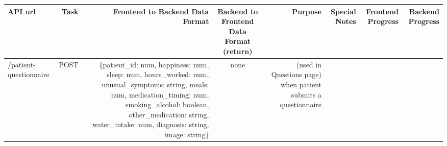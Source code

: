 \documentclass[]{book}
\begin{document}
\begin{longtable}[]{@{}lrrcrrrr@{}}
\toprule
\begin{minipage}[b]{0.13\columnwidth}\raggedright
API url\strut
\end{minipage} & \begin{minipage}[b]{0.14\columnwidth}\raggedleft
Task\strut
\end{minipage} & \begin{minipage}[b]{0.14\columnwidth}\raggedleft
Frontend to Backend Data Format\strut
\end{minipage} & \begin{minipage}[b]{0.15\columnwidth}\centering
Backend to Frontend Data Format (return)\strut
\end{minipage} & \begin{minipage}[b]{0.06\columnwidth}\raggedleft
Purpose\strut
\end{minipage} & \begin{minipage}[b]{0.06\columnwidth}\raggedleft
Special Notes\strut
\end{minipage} & \begin{minipage}[b]{0.06\columnwidth}\raggedleft
Frontend Progress\strut
\end{minipage} & \begin{minipage}[b]{0.06\columnwidth}\raggedleft
Backend Progress\strut
\end{minipage}\tabularnewline
\midrule
\endhead
\begin{minipage}[t]{0.13\columnwidth}\raggedright
/patient-questionnaire\strut
\end{minipage} & \begin{minipage}[t]{0.14\columnwidth}\raggedleft
POST\strut
\end{minipage} & \begin{minipage}[t]{0.14\columnwidth}\raggedleft
\{patient\_id: num, happiness: num, sleep: num, hours\_worked: num, unusual\_symptoms: string, meals: num, medication\_timing: num, smoking\_alcohol: boolean, other\_medication: string, water\_intake: num, diagnosis: string, image: string\}\strut
\end{minipage} & \begin{minipage}[t]{0.15\columnwidth}\centering
none\strut
\end{minipage} & \begin{minipage}[t]{0.06\columnwidth}\raggedleft
(used in Questions page) when patient submits a questionnaire\strut
\end{minipage} & \begin{minipage}[t]{0.06\columnwidth}\raggedleft

\end{minipage}
\end{longtable}
\end{document}

